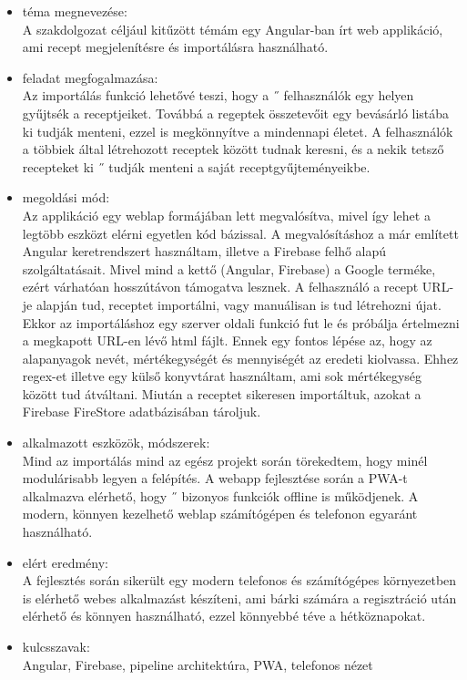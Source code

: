 \documentclass[12pt]{report}
\theoremstyle{definition}
\begin{document}
\begin{itemize}
	\item téma megnevezése: \\
	A szakdolgozat céljául kitűzött témám egy Angular-ban írt web applikáció, ami recept megjelenítésre és importálásra használható.
	\item feladat megfogalmazása: \\
	Az importálás funkció lehetővé teszi, hogy a ˝ felhasználók egy helyen gyűjtsék a receptjeiket. Továbbá a regeptek összetevőit egy bevásárló listába ki tudják menteni, ezzel is megkönnyítve a mindennapi életet. A felhasználók a többiek által létrehozott receptek között tudnak keresni, és a nekik tetsző recepteket ki ˝ tudják menteni a saját receptgyűjteményeikbe.
	\item megoldási mód: \\
	Az applikáció egy weblap formájában lett megvalósítva, mivel így lehet a legtöbb eszközt elérni egyetlen kód bázissal. A megvalósításhoz a már említett Angular keretrendszert használtam, illetve a Firebase felhő alapú szolgáltatásait. Mivel mind a kettő (Angular, Firebase) a Google terméke, ezért várhatóan hosszútávon támogatva lesznek. A felhasználó a recept URL-je alapján tud, receptet importálni, vagy manuálisan is tud létrehozni újat. Ekkor az importáláshoz egy szerver oldali funkció fut le és próbálja értelmezni a megkapott URL-en lévő html fájlt. Ennek egy fontos lépése az, hogy az alapanyagok nevét, mértékegységét és mennyiségét az eredeti kiolvassa. Ehhez regex-et illetve egy külső konyvtárat használtam, ami sok mértékegység között tud átváltani. Miután a receptet sikeresen importáltuk, azokat a Firebase FireStore adatbázisában tároljuk.
	\item alkalmazott eszközök, módszerek: \\
	Mind az importálás mind az egész projekt során törekedtem, hogy minél modulárisabb legyen a felépítés. A webapp fejlesztése során a PWA-t alkalmazva elérhető, hogy ˝ bizonyos funkciók offline is működjenek. A modern, könnyen kezelhető weblap számítógépen és telefonon egyaránt használható.
	\item elért eredmény: \\
	A fejlesztés során sikerült egy modern telefonos és számítógépes környezetben is elérhető webes alkalmazást készíteni, ami bárki számára a regisztráció után elérhető és könnyen használható, ezzel könnyebbé téve a hétköznapokat.
	\item kulcsszavak: \\
	Angular, Firebase, pipeline architektúra, PWA, telefonos nézet
\end{itemize}
\end{document}
